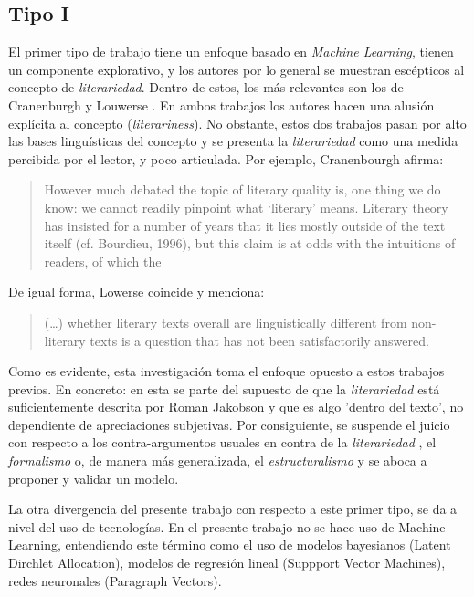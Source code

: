 \documentclass[12pt,letterpaper,twoside]{article}
\begin{document}
\subsection{Tipo I}
\label{sec:orgb397fa8}
El primer tipo de trabajo tiene un enfoque basado en \emph{Machine
Learning}, tienen un componente explorativo, y los autores por lo
general se muestran escépticos al concepto de \emph{literariedad}. Dentro
de estos, los más relevantes son los de Cranenburgh
\cite{van2019vector} \cite{van2015identifying} y Louwerse
\cite{louwerse2008computationally}. En ambos trabajos los autores
hacen una alusión explícita al concepto (\emph{literariness}). No obstante,
estos dos trabajos pasan por alto las bases linguísticas del concepto
y se presenta la \emph{literariedad} como una medida percibida por el
lector, y poco articulada. Por ejemplo, Cranenbourgh afirma:

\begin{quote}
However much debated the topic of literary quality is, one thing we do
know: we cannot readily pinpoint what ‘literary’ means. Literary
theory has insisted for a number of years that it lies mostly outside
of the text itself (cf. Bourdieu, 1996), but this claim is at odds
with the intuitions of readers, of which the
\cite[pg. 58]{van2015identifying}
\end{quote}


De igual forma, Lowerse coincide y menciona:


\begin{quote}
(\ldots{}) whether literary texts overall are linguistically different from
non-literary texts is a question that has not been satisfactorily
answered.\cite[pg. 176]{louwerse2008computationally}
\end{quote}

Como es evidente, esta investigación toma el enfoque opuesto a estos
trabajos previos. En concreto: en esta se parte del supuesto de que la
\emph{literariedad} está suficientemente descrita por Roman Jakobson y que
es algo 'dentro del texto', no dependiente de apreciaciones
subjetivas. Por consiguiente, se suspende el juicio con respecto a los
contra-argumentos usuales en contra de la \emph{literariedad}
\cite{chuit2019epistemologia}, el \emph{formalismo} o, de manera más
generalizada, el \emph{estructuralismo} y se aboca a proponer y validar
un modelo. 

La otra divergencia del presente trabajo con respecto a este primer
tipo, se da a nivel del uso de tecnologías. En el presente trabajo no
se hace uso de Machine Learning, entendiendo este término como el uso
de modelos bayesianos (Latent Dirchlet Allocation), modelos de
regresión lineal (Suppport Vector Machines), redes neuronales
(Paragraph Vectors).
\end{document}
